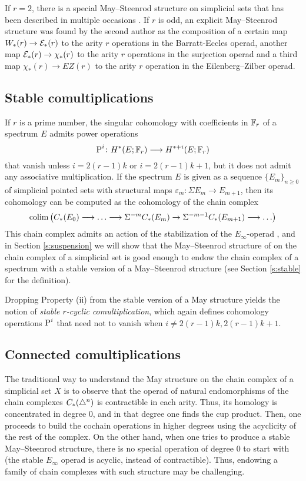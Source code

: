 If $r=2$, there is a special May--Steenrod structure on simplicial sets that has been described in multiple occasions \cite{steenrod1947products,gonzalez-diaz1999steenrod,medina2021fast_sq}. If $r$ is odd, an explicit May--Steenrod structure was found by the second author \cite{medina2021may_st} as the composition of a certain map $W_*(r)\to \mathcal{E}_*(r)$ to the arity $r$ operations in the Barratt-Eccles operad, another map $\mathcal{E}_*(r)\to \chi_*(r)$ to the arity $r$ operations in the surjection operad \cite{berger2004combinatorial} and a third map $\chi_*(r)\to EZ(r)$ to the arity $r$ operation in the Eilenberg--Zilber operad\cite{mcclure2003multivariable}.

\subsection{Stable comultiplications} If $r$ is a prime number, the singular cohomology with coefficients in $\mathbb{F}_r$ of a spectrum $E$ admits power operations
\[
\operatorname{P}^i\colon H^*(E;\mathbb{F}_r)\longrightarrow H^{*+i}(E;\mathbb{F}_r)
\]
that vanish unless $i = 2(r-1)k$ or $i = 2(r-1)k+1$, but it does not admit any associative multiplication. If the spectrum $E$ is given as a sequence $\{E_m\}_{n\geq 0}$ of simplicial pointed sets with structural maps $\varepsilon_m\colon \Sigma E_m\to E_{m+1}$, then its cohomology can be computed as the cohomology of the chain complex
\[
\operatorname*{colim} \left(C_*(E_0)\longrightarrow \ldots \longrightarrow \Sigma^{-m}C_*(E_m)\to \Sigma^{-m-1} C_*(E_{m+1})\longrightarrow\ldots\right)
\]
This chain complex admits an action of the stabilization of the $E_{\infty}$-operad \cite{Gill2020}, and in Section \ref{s:suspension} we will show that the May--Steenrod structure of \cite{medina2021may_st} on the chain complex of a simplicial set is good enough to endow the chain complex of a spectrum with a stable version of a May--Steenrod structure (see Section \ref{s:stable} for the definition).

Dropping Property (ii) from the stable version of a May structure yields the notion of \emph{stable $r$-cyclic comultiplication}, which again defines cohomology operations $\operatorname{P}^i$ that need not to vanish when $i \neq 2(r-1)k, 2(r-1)k+1$.

\subsection{Connected comultiplications} The traditional way to understand the May structure on the chain complex of a simplicial set $X$ is to observe that the operad of natural endomorphisms of the chain complexes $C_*(\triangle^n)$ is contractible in each arity. Thus, its homology is concentrated in degree $0$, and in that degree one finds the cup product. Then, one proceeds to build the cochain operations in higher degrees using the acyclicity of the rest of the complex. On the other hand, when one tries to produce a stable May--Steenrod structure, there is no special operation of degree $0$ to start with (the stable $E_{\infty}$ operad is acyclic, instead of contractible). Thus, endowing a family of chain complexes with such structure may be challenging.

